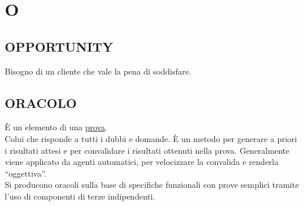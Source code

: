 \newpage
	\section{O} \label{sec:O}
	
		\subsection{OPPORTUNITY}  \label{opportunity}
		Bisogno di un cliente che vale la pena di soddisfare.
	
		\subsection{ORACOLO}		\label{oracolo}	%
		È un elemento di una \underline{\hyperref[testsuite]{prova}}. \\
		Colui che risponde a tutti i dubbi e domande. È un metodo per generare a priori i risultati attesi e per convalidare i risultati ottenuti nella prova.
		Generalmente viene applicato da agenti automatici, per velocizzare la convalida e renderla ``oggettiva''. \\
		Si producono oracoli sulla base di specifiche funzionali con prove semplici tramite l'uso di componenti di terze indipendenti.
		
	
